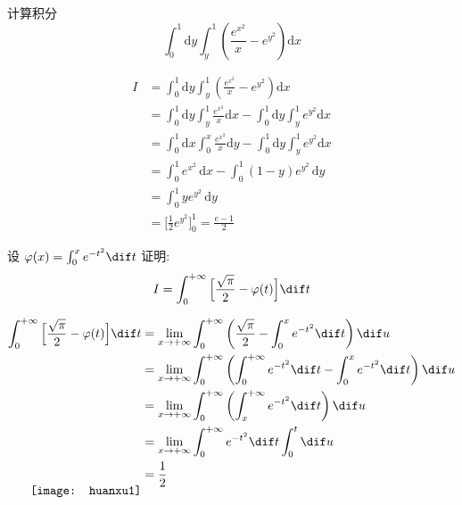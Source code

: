 \documentclass[color=green,titlestyle=hang]{elegantbook}%
\begin{document}
\begin{exercise} 计算积分 \begin{equation*}\int_{0}^{1}\mathrm{d}y\!\!\int_{y}^{1}\left(\frac{e^{x^2}}{x}-e^{y^2}\right)\mathrm{d}x\end{equation*}\end{exercise}
\begin{Solution} 
\begin{align*}I&=\int_{0}^{1}\mathrm{d}y\!\!\int_{y}^{1}\left(\frac{e^{x^2}}{x}-e^{y^2}\right)\mathrm{d}x\\
&=\int_{0}^{1}\mathrm{d}y\!\!\int_{y}^{1}\frac{e^{x^2}}{x}\mathrm{d}x-\int_{0}^{1}\mathrm{d}y\!\!\int_{y}^{1}e^{y^2}\mathrm{d}x\\
&=\int_{0}^{1}\mathrm{d}x\!\!\int_{0}^{x}\frac{e^{x^2}}{x}\mathrm{d}y-\int_{0}^{1}\mathrm{d}y\!\!\int_{y}^{1}e^{y^2}\mathrm{d}x\\
&=\int_{0}^{1}e^{x^2}\,\mathrm{d}x-\int_{0}^{1}(1-y)e^{y^2}\,\mathrm{d}y\\
&=\int_{0}^{1}ye^{y^2}\,\mathrm{d}y\\
&=\Big[\frac{1}{2}e^{y^2}\Big]_{0}^{1}=\frac{e-1}{2}
\end{align*}
\end{Solution}

\begin{exercise} 设 $\varphi(x)=\int_0^xe^{-t^2}\dif t$ 证明:  \[I=\int_0^{+\infty}\Big[\frac{\sqrt{\pi}}{2}-\varphi(t)\Big]\dif t\]\end{exercise}
\begin{Solution}
\begin{align*}
\int_0^{+\infty}\Big[\frac{\sqrt{\pi}}{2}-\varphi(t)\Big]\dif t&=
\lim_{x\to+\infty}\int_0^{+\infty}\left(\frac{\sqrt{\pi}}{2}-\int_0^xe^{-t^2}\dif t\right)\dif u\\
&=\lim_{x\to+\infty}\int_0^{+\infty}\left(\int_0^{+\infty}e^{-t^2}\dif t-\int_0^xe^{-t^2}\dif t\right)\dif u\\
&=
\lim_{x\to+\infty}\int_0^{+\infty}\left(\int_x^{+\infty}e^{-t^2}\dif t\right)\dif u\\
&=\lim_{x\to+\infty}\int_0^{+\infty}e^{-t^2}\dif t\int_0^{t}\dif u\\
\smash{\raisebox{-3ex}{\texttt{[image: huanxu1]}}}&=\frac{1}{2}
\end{align*}
\end{Solution}
\end{document}
